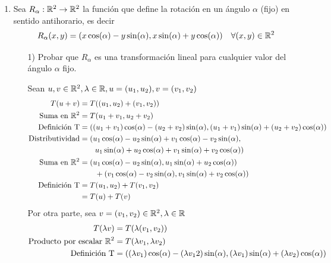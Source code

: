 \item \begin{enumerate}
        \item Sea $R_\alpha:\mathbb{R}^2\to\mathbb{R}^2$ la función que define la rotación en un ángulo $\alpha$ (fijo) en sentido antihorario, es decir \[R_\alpha(x,y)=(x \cos(\alpha)-y\sin(\alpha),x\sin(\alpha)+y\cos(\alpha))\quad\forall(x,y)\in\mathbb{R}^2\]
            \begin{enumerate}
                \item[1)] Probar que $R_\alpha$ es una transformación lineal para cualquier valor del ángulo $\alpha$ fijo.
                    \begin{mdframed}[style=s]
                        Sean $u,v\in\mathbb{R}^2,\lambda\in\mathbb{R}, u=(u_1,u_2),v=(v_1,v_2)$
                        \begin{align*}
                            T(u+v)&=T((u_1,u_2)+(v_1,v_2))\\
                            \text{Suma en }\mathbb{R}^2&=T(u_1+v_1,u_2+v_2)\\
                            \text{Definición T}&=((u_1+v_1)\cos(\alpha)-(u_2+v_2)\sin(\alpha),(u_1+v_1)\sin(\alpha)+(u_2+v_2)\cos(\alpha))\\
                            \text{Distributividad}&=(u_1\cos(\alpha)-u_2\sin(\alpha)+v_1\cos(\alpha)-v_2\sin(\alpha),\\
                            &\qquad u_1\sin(\alpha)+u_2\cos(\alpha)+v_1\sin(\alpha)+v_2\cos(\alpha))\\
                            \text{Suma en }\mathbb{R}^2&=(u_1\cos(\alpha)-u_2\sin(\alpha),u_1\sin(\alpha)+u_2\cos(\alpha))\\
                            &\qquad +(v_1\cos(\alpha)-v_2\sin(\alpha),v_1\sin(\alpha)+v_2\cos(\alpha))\\
                            \text{Definición T}&=T(u_1,u_2)+T(v_1,v_2)\\
                            &=T(u)+T(v)
                        \end{align*}
                        Por otra parte, sea $v=(v_1,v_2)\in\mathbb{R}^2,\lambda\in\mathbb{R}$
                        \begin{align*}
                            T(\lambda v)&=T(\lambda(v_1,v_2))\\
                            \text{Producto por escalar }\R^2&=T(\lambda v_1,\lambda v_2)\\
                            \text{Definición T}&=((\lambda v_1)\cos(\alpha)-(\lambda v_12)\sin(\alpha),(\lambda v_1)\sin(\alpha)+(\lambda v_2)\cos(\alpha))\\

\end{align*}
\end{mdframed}
\end{enumerate}
\end{enumerate}
